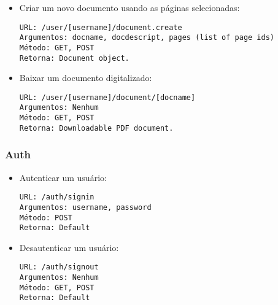 \begin{itemize}
\item Criar um novo documento usando as páginas selecionadas:
\begin{verbatim}
URL: /user/[username]/document.create
Argumentos: docname, docdescript, pages (list of page ids)
Método: GET, POST
Retorna: Document object.
\end{verbatim}

\item Baixar um documento digitalizado:
\begin{verbatim}
URL: /user/[username]/document/[docname]
Argumentos: Nenhum
Método: GET, POST
Retorna: Downloadable PDF document.
\end{verbatim}

\end{itemize}

\subsubsection{Auth}

\begin{itemize}

\item Autenticar um usuário:
\begin{verbatim}
URL: /auth/signin
Argumentos: username, password
Método: POST
Retorna: Default
\end{verbatim}

\item Desautenticar um usuário:
\begin{verbatim}
URL: /auth/signout
Argumentos: Nenhum
Método: GET, POST
Retorna: Default
\end{verbatim} 

\end{itemize}
